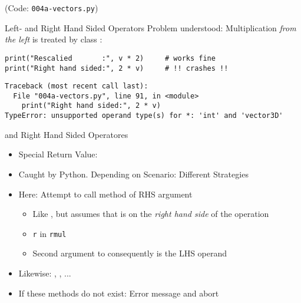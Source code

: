 
\begin{frame}
%
\begin{center}
	(Code: \texttt{004a-vectors.py})
\end{center}
%
\end{frame}


\begin{frame}[fragile]{Left- and Right Hand Sided Operators}
%
Problem understood: Multiplication \emph{from the left} is treated by class :
\begin{warnbox}[Example: Right Hand Sided Multiplication, leftupper=6mm]
\begin{verbatim}
print("Rescalied       :", v * 2)     # works fine
print("Right hand sided:", 2 * v)     # !! crashes !!
\end{verbatim}
\end{warnbox}
%
\begin{cmdbox}
\begin{verbatim}
Traceback (most recent call last):
  File "004a-vectors.py", line 91, in <module>
    print("Right hand sided:", 2 * v)
TypeError: unsupported operand type(s) for *: 'int' and 'vector3D'
\end{verbatim}
\end{cmdbox}
%
\end{frame}


\begin{frame}[fragile]{ and Right Hand Sided Operatores}
%
\begin{itemize}
\item Special Return Value: 
\item Caught by Python. Depending on Scenario: Different Strategies
\item Here: Attempt to call method  of RHS argument
	\begin{itemize}
	\item Like , but assumes that  is on the \emph{right hand side} of the operation
	\item[\Thus] \texttt{r} in \texttt{rmul}
	\item[\Thus] Second argument to  consequently is the LHS operand
	\end{itemize}
\item Likewise: , , ...
\item If these methods do not exist: Error message and abort
\end{itemize}
%
\end{frame}


